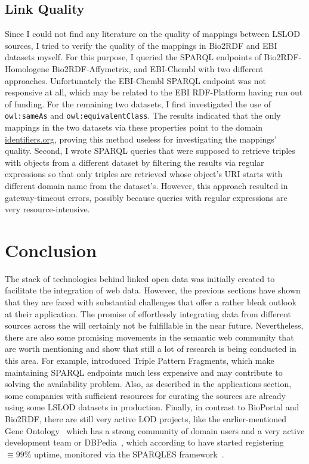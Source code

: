 \documentclass[runningheads]{llncs}
\begin{document}
    \subsection{Link Quality}
    Since I could not find any literature on the quality of mappings between LSLOD sources, I tried to verify the quality of the mappings in Bio2RDF and EBI datasets myself.
    For this purpose, I queried the SPARQL endpoints of Bio2RDF-Homologene Bio2RDF-Affymetrix, and EBI-Chembl with two different approaches.
    Unfortunately the EBI-Chembl SPARQL endpoint was not responsive at all, which may be related to the EBI RDF-Platform having run out of funding.
    For the remaining two datasets, I first investigated the use of \texttt{owl:sameAs} and \texttt{owl:equivalentClass}.
    The results indicated that the only mappings in the two datasets via these properties point to the domain \url{identifiers.org}, proving this method useless for investigating the mappings' quality.
    Second, I wrote SPARQL queries that were supposed to retrieve triples with objects from a different dataset by filtering the results via regular expressions so that only triples are retrieved whose object's URI starts with different domain name from the dataset's.
    However, this approach resulted in gateway-timeout errors, possibly because queries with regular expressions are very resource-intensive.

    \section{Conclusion}
    The stack of technologies behind linked open data was initially created to facilitate the integration of web data.
    However, the previous sections have shown that they are faced with substantial challenges that offer a rather bleak outlook at their application.
    The promise of effortlessly integrating data from different sources across the will certainly not be fulfillable in the near future.
    Nevertheless, there are also some promising movements in the semantic web community that are worth mentioning and show that still a lot of research is being conducted in this area.
    For example, \citet{verborgh2016triple} introduced Triple Pattern Fragments, which make maintaining SPARQL endpoints much less expensive and may contribute to solving the availability problem.
    Also, as described in the applications section, some companies with sufficient resources for curating the sources are already using some LSLOD datasets in production.
    Finally, in contrast to BioPortal and Bio2RDF, there are still very active LOD projects, like the earlier-mentioned Gene Ontology~\citep{gene2015gene} which has a strong community of domain users and a very active development team or DBPedia~\citep{auer2007dbpedia}, which according to \citet{kamdar2019enabling} have started registering $\equiv99\%$ uptime, monitored via the SPARQLES framework~\citep{vandenbussche2017sparqles}.

%
%
%
    
    
%
\end{document}
